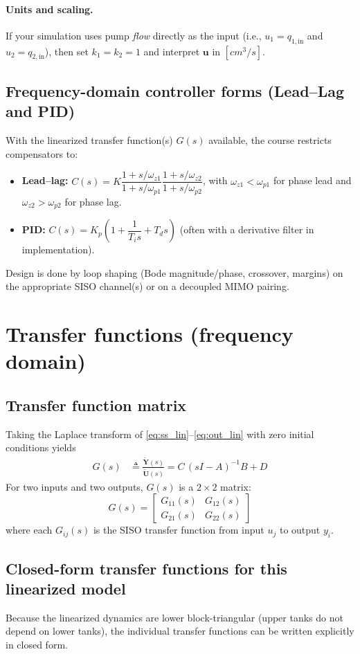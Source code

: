 \documentclass[11pt]{article}
\begin{document}
\paragraph{Units and scaling.}
If your simulation uses pump \emph{flow} directly as the input (i.e., \(u_1=q_{1,\text{in}}\) and \(u_2=q_{2,\text{in}}\)),
then set \(k_1=k_2=1\) and interpret \(\bm{u}\) in \([\si{cm^3/s}]\).

\subsection{Frequency-domain controller forms (Lead--Lag and PID)}
With the linearized transfer function(s) \(G(s)\) available, the course restricts compensators to:
\begin{itemize}
  \item \textbf{Lead--lag:} \(C(s)=K \dfrac{1+s/\omega_{z1}}{1+s/\omega_{p1}}\dfrac{1+s/\omega_{z2}}{1+s/\omega_{p2}}\), with \(\omega_{z1}<\omega_{p1}\) for phase lead and \(\omega_{z2}>\omega_{p2}\) for phase lag.
  \item \textbf{PID:} \(C(s)=K_p\left(1+\dfrac{1}{T_i s}+T_d s\right)\) (often with a derivative filter in implementation).
\end{itemize}
Design is done by loop shaping (Bode magnitude/phase, crossover, margins) on the appropriate SISO channel(s) or on a decoupled MIMO pairing.

\section{Transfer functions (frequency domain)}
\subsection{Transfer function matrix}
Taking the Laplace transform of \eqref{eq:ss_lin}--\eqref{eq:out_lin} with zero initial conditions yields
\begin{align}
G(s) &\triangleq \frac{\tilde{\bm{Y}}(s)}{\tilde{\bm{U}}(s)}
= C\,(sI-A)^{-1}B + D
\label{eq:G}
\end{align}
For two inputs and two outputs, \(G(s)\) is a \(2\times 2\) matrix:
\[
G(s)=
\begin{bmatrix}
G_{11}(s) & G_{12}(s)\\
G_{21}(s) & G_{22}(s)
\end{bmatrix}
\]
where each \(G_{ij}(s)\) is the SISO transfer function from input \(u_j\) to output \(y_i\).

\subsection{Closed-form transfer functions for this linearized model}
Because the linearized dynamics are lower block-triangular (upper tanks do not depend on lower tanks),
the individual transfer functions can be written explicitly in closed form.
\end{document}

